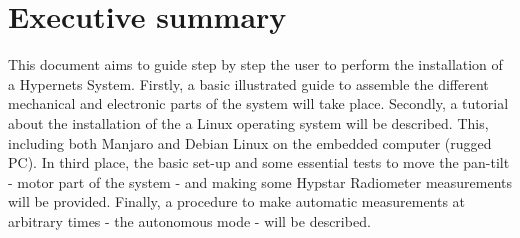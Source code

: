 \documentclass[a4paper,11pt,notitlepage]{article}
\begin{document}
\section{Executive summary}

This document aims to guide step by step the user to perform the installation of
a Hypernets System. Firstly, a basic illustrated guide to assemble the
different mechanical and electronic parts of the system will take place.
Secondly, a tutorial about the installation of the a Linux operating system will be 
described. This, including both Manjaro and Debian Linux on the embedded computer 
(rugged PC). In third place, the basic set-up and some essential tests to move the 
pan-tilt - motor part of the system - and making some Hypstar Radiometer measurements 
will be provided. Finally, a procedure to make automatic measurements at 
arbitrary times - the autonomous mode - will be described.

\newpage













\end{document}
